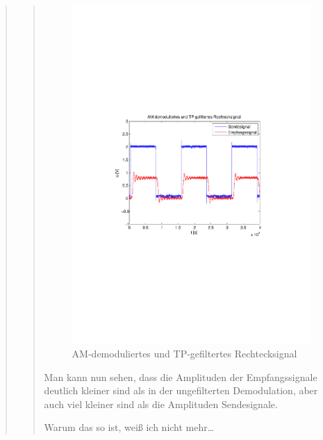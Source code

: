 \begin{quote}
\begin{quote}
             \begin{figure}[H] \centering
                    \includegraphics[scale=0.5, trim = 2cm 6.5cm 1.5cm 8.5cm,
                    clip]{./Bilder/synchDemodFilter_rechteck}
                        \caption{AM-demoduliertes und
                        TP-gefiltertes Rechtecksignal}
                \end{figure}
                
                Man kann nun sehen, dass die Amplituden der Empfangssignale
                deutlich kleiner sind als in der ungefilterten Demodulation,
                aber auch viel kleiner sind als die Amplituden Sendesignale.
                
                Warum das so ist, weiß ich nicht mehr\ldots
                
                 
         
    \end{quote}
\end{quote}

